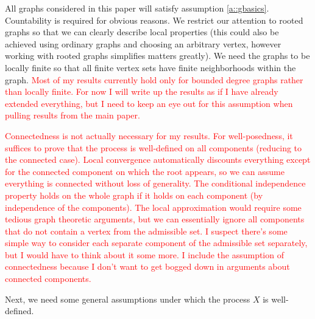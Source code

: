 \documentclass[12pt]{article}
\newcommand{\tr}{\textcolor{red}}
\newcommand{\ind}{\hspace{24pt}}
\newcommand{\Xf}{X}									%
\begin{document}
All graphs considered in this paper will satisfy assumption \ref{a::gbasics}. Countability is required for obvious reasons. We restrict our attention to rooted graphs so that we can clearly describe local properties (this could also be achieved using ordinary graphs and choosing an arbitrary vertex, however working with rooted graphs simplifies matters greatly). We need the graphs to be locally finite so that all finite vertex sets have finite neighborhoods within the graph. \tr{Most of my results currently hold only for bounded degree graphs rather than locally finite. For now I will write up the results as if I have already extended everything, but I need to keep an eye out for this assumption when pulling results from the main paper.}

\ind \tr{Connectedness is not actually necessary for my results. For well-posedness, it suffices to prove that the process is well-defined on all components (reducing to the connected case). Local convergence automatically discounts everything except for the connected component on which the root appears, so we can assume everything is connected without loss of generality. The conditional independence property holds on the whole graph if it holds on each component (by independence of the components). The local approximation would require some tedious graph theoretic arguments, but we can essentially ignore all components that do not contain a vertex from the admissible set. I suspect there's some simple way to consider each separate component of the admissible set separately, but I would have to think about it some more. I include the assumption of connectedness because I don't want to get bogged down in arguments about connected components.}

\ind Next, we need some general assumptions under which the process \(\Xf\) is well-defined.
\end{document}
